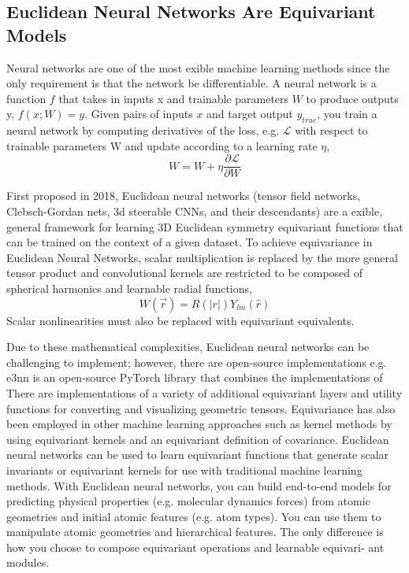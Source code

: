 \documentclass[book.tex]{subfiles}
\begin{document}
\subsection{Euclidean Neural Networks Are Equivariant Models}
Neural networks are one of the most exible machine learning methods since the only requirement is that the
network be differentiable. A neural network is a function $f$ that takes in inputs x and trainable parameters $W$ to
produce outputs y, $f(x;W) = y$. Given pairs of inputs $x$ and target output $y_{true}$, you train a neural network by
computing derivatives of the loss, e.g. $\mathcal{L}$ with respect to trainable parameters W and update according to a learning rate $\eta$, 
\[W = W + \eta\frac{\partial \mathcal{L}}{\partial W}\]

First proposed in 2018, Euclidean neural networks
(tensor field networks, Clebsch-Gordan nets, 3d steerable CNNs, and their descendants) are a  exible, general framework for learning 3D Euclidean symmetry equivariant functions that can be trained on the context of a given dataset. To achieve equivariance in Euclidean Neural Networks, scalar multiplication is replaced by the more general tensor product and convolutional kernels are restricted to be composed of spherical harmonics and learnable radial functions, \[W(\vec{r})=R(|r|)Y_{lm}(\hat{r})\]
Scalar nonlinearities must also be replaced with equivariant equivalents.

Due to these mathematical complexities, Euclidean neural networks can be challenging to implement; however, there are open-source implementations e.g. e3nn is an open-source PyTorch library that combines the implementations of There are implementations of a variety of additional equivariant layers and utility functions for converting and visualizing geometric tensors. Equivariance has also been employed in other machine learning approaches such as kernel methods by using
equivariant kernels and an equivariant definition of covariance. Euclidean neural networks can be used to learn equivariant functions that generate scalar invariants or equivariant kernels for use with traditional machine learning methods.
With Euclidean neural networks, you can build end-to-end models for predicting physical properties (e.g. molecular dynamics forces) from atomic geometries and initial atomic features (e.g. atom types). You can use them to manipulate atomic geometries and hierarchical features. The only difference is how you choose to compose equivariant operations and learnable equivari-
ant modules.
\end{document}
